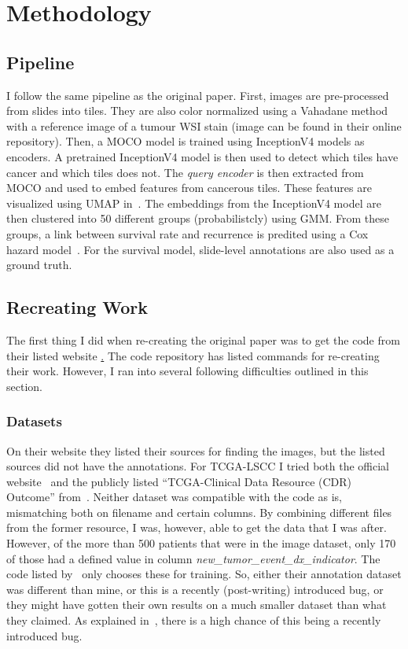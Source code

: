 \documentclass[10pt,twocolumn,letterpaper]{article}
\begin{document}
\section{Methodology}\label{sec:methodology}
\subsection{Pipeline}
I follow the same pipeline as the original paper. First, images are pre-processed from slides into tiles. They are also color normalized using a Vahadane method~\cite{vahadane} with a reference image of a tumour WSI stain (image can be found in their online repository). Then, a \gls{MOCO} model is trained using InceptionV4 models as encoders. A pretrained InceptionV4 model is then used to detect which tiles have cancer and which tiles does not. The \textit{query encoder} is then extracted from \gls{MOCO} and used to embed features from cancerous tiles. These features are visualized using \gls{UMAP} in~. The embeddings from the InceptionV4 model are then clustered into 50 different groups (probabilistcly) using \gls{GMM}. From these groups, a link between survival rate and recurrence is predited using a Cox hazard model~\cite{cox1972regression}. For the survival model, slide-level annotations are also used as a ground truth.

\subsection{Recreating Work}
The first thing I did when re-creating the original paper was to get the code from their listed website \href{https://github.com/NYUMedML/conditional_ssl_hist}. The code repository has listed commands for re-creating their work. However, I ran into several following difficulties outlined in this section.

\subsubsection{Datasets}
On their website they listed their sources for finding the images, but the listed sources did not have the annotations. For \gls{TCGA}-\gls{LSCC} I tried both the official website~\cite{tcgaAnnotation} and the publicly listed ``\gls{TCGA}-Clinical Data Resource (CDR) Outcome'' from~\cite{pancan}. Neither dataset was compatible with the code as is, mismatching both on filename and certain columns. By combining different files from the former resource, I was, however, able to get the data that I was after. However, of the more than 500 patients that were in the image dataset, only 170 of those had a defined value in column \textit{new\_tumor\_event\_dx\_indicator}. 
The code listed by~\cite{sslUMAP} only chooses these for training. So, either their annotation dataset was different than mine, or this is a recently (post-writing) introduced bug, or they might have gotten their own results on a much smaller dataset than what they claimed. As explained in~, there is a high chance of this being a recently introduced bug.
\end{document}
